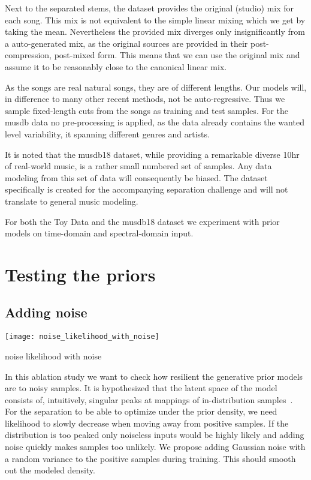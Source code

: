 Next to the separated stems, the dataset provides the original (studio) mix for each song. This mix is not equivalent to the simple linear mixing which we get by taking the mean. Nevertheless the provided mix diverges only insignificantly from a auto-generated mix, as the original sources are provided in their post-compression, post-mixed form. This means that we can use the original mix and assume it to be reasonably close to the canonical linear mix.

As the songs are real natural songs, they are of different lengths. Our models will, in difference to many other recent methods, not be auto-regressive. Thus we sample fixed-length cuts from the songs as training and test samples. For the musdb data no pre-processing is applied, as the data already contains the wanted level variability, it spanning different genres and artists.

It is noted that the musdb18 dataset, while providing a remarkable diverse 10hr of real-world music, is a rather small numbered set of samples. Any data modeling from this set of data will consequently be biased. The dataset specifically is created for the accompanying separation challenge and will not translate to general music modeling.

For both the Toy Data and the musdb18 dataset we experiment with prior models on time-domain and spectral-domain input.

\section{Testing the priors}

\subsection{Adding noise}
\begin{marginfigure}
    \texttt{[image: noise\_likelihood\_with\_noise]}%
    \caption{noise likelihood with noise}%
    \label{fig:noise_ll_with_noise}
\end{marginfigure}

In this ablation study we want to check how resilient the generative prior models are to noisy samples. It is hypothesized that the latent space of the model consists of, intuitively, singular peaks at mappings of in-distribution samples~\cite{jayaramSource2020}. For the separation to be able to optimize under the prior density, we need likelihood to slowly decrease when moving away from positive samples. If the distribution is too peaked only noiseless inputs would be highly likely and adding noise quickly makes samples too unlikely. We propose adding Gaussian noise with a random variance to the positive samples during training. This should smooth out the modeled density.

